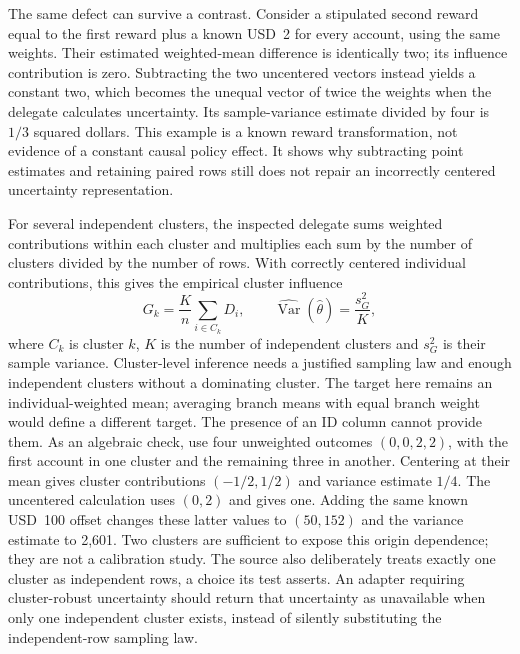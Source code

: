 The same defect can survive a contrast. Consider a stipulated second reward
equal to the first reward plus a known USD~2 for every account, using the
same weights. Their estimated weighted-mean difference is identically two;
its influence contribution is zero. Subtracting the two uncentered vectors
instead yields a constant two, which becomes the unequal vector of twice
the weights when the delegate calculates uncertainty. Its sample-variance
estimate divided by four is $1/3$ squared dollars. This example is a known
reward transformation, not evidence of a constant causal policy effect. It
shows why subtracting point estimates and retaining paired rows still does
not repair an incorrectly centered uncertainty representation.
\citep{rel23ifewitness}

For several independent clusters, the inspected delegate sums weighted
contributions within each cluster and multiplies each sum by the number of
clusters divided by the number of rows. With correctly centered individual
contributions, this gives the empirical cluster influence
\begin{equation}
 G_k=\frac{K}{n}\sum_{i\in C_k}D_i,\qquad
 \widehat{\operatorname{Var}}(\widehat\theta)
       =\frac{s_G^2}{K},
 \label{rel23:cluster-influence}
\end{equation}
where $C_k$ is cluster $k$, $K$ is the number of independent clusters and
$s_G^2$ is their sample variance. Cluster-level inference needs a justified
sampling law and enough independent clusters without a dominating cluster.
The target here remains an individual-weighted mean; averaging branch means
with equal branch weight would define a different target. The presence of an ID column
cannot provide them. As an algebraic check, use four unweighted outcomes
$(0,0,2,2)$, with the first account in one cluster and the remaining three in
another. Centering at their mean gives cluster contributions $(-1/2,1/2)$
and variance estimate $1/4$. The uncentered calculation uses $(0,2)$ and gives
one. Adding the same known USD~100 offset changes these latter values to
$(50,152)$ and the variance estimate to 2,601. Two clusters are sufficient to
expose this origin dependence; they are not a calibration study. The source
also deliberately treats exactly one cluster as independent rows, a choice
its test asserts. An adapter requiring cluster-robust uncertainty should
return that uncertainty as unavailable when only one independent cluster
exists, instead of silently substituting the independent-row sampling law.
\citep{rel23ife,rel23ifewitness}

